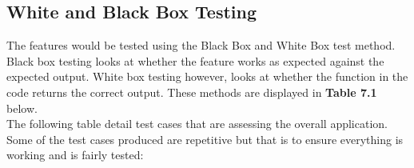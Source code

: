\documentclass[oneside]{report}
\begin{document}
		\subsection{White and Black Box Testing}
		
		The features would be tested using the Black Box and White Box test method. Black box testing looks at whether the feature works as expected against the expected output. White box testing however, looks at whether the function in the code returns the correct output. These methods are displayed in \textbf{Table 7.1} below.\\
		
		The following table detail test cases that are assessing the overall application. Some of the test cases produced are repetitive but that is to ensure everything is working and is fairly tested:
		
\end{document}
